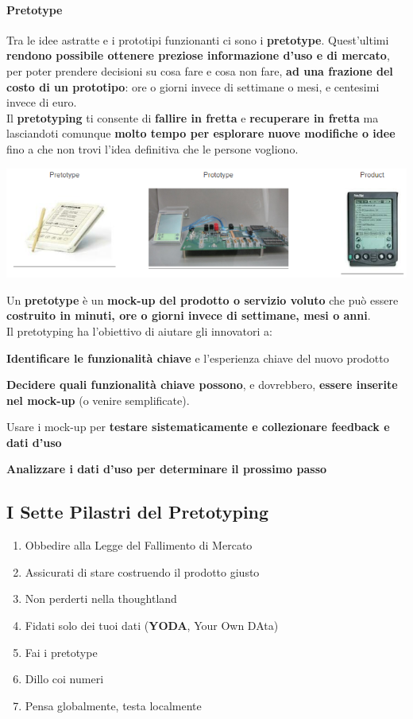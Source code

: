 \documentclass[10pt]{article}
\begin{document}
\paragraph{Pretotype} Tra le idee astratte e i prototipi funzionanti ci sono i \textbf{pretotype}. Quest'ultimi \textbf{rendono possibile ottenere preziose informazione d'uso e di mercato}, per poter prendere decisioni su cosa fare e cosa non fare, \textbf{ad una frazione del costo di un prototipo}: ore o giorni invece di settimane o mesi, e centesimi invece di euro.\\
Il \textbf{pretotyping} ti consente di \textbf{fallire in fretta} e \textbf{recuperare in fretta} ma lasciandoti comunque \textbf{molto tempo per esplorare nuove modifiche o idee} fino a che non trovi l'idea definitiva che le persone vogliono.
\begin{center}
\includegraphics[scale=1]{pretotype.png}
\end{center}
Un \textbf{pretotype} è un \textbf{mock-up del prodotto o servizio voluto} che può essere \textbf{costruito in minuti, ore o giorni invece di settimane, mesi o anni}.\\
Il pretotyping ha l'obiettivo di aiutare gli innovatori a:
\begin{list}{}{}
\item \textbf{Identificare le funzionalità chiave} e l'esperienza chiave del nuovo prodotto
\item \textbf{Decidere quali funzionalità chiave possono}, e dovrebbero, \textbf{essere inserite nel mock-up} (o venire semplificate).
\item Usare i mock-up per \textbf{testare sistematicamente e collezionare feedback e dati d'uso}
\item \textbf{Analizzare i dati d'uso per determinare il prossimo passo}
\end{list}
\subsection{I Sette Pilastri del Pretotyping}
\begin{enumerate}
\item Obbedire alla Legge del Fallimento di Mercato
\item Assicurati di stare costruendo il prodotto giusto
\item Non perderti nella thoughtland
\item Fidati solo dei tuoi dati (\textbf{YODA}, Your Own DAta)
\item Fai i pretotype
\item Dillo coi numeri
\item Pensa globalmente, testa localmente
\end{enumerate}
\pagebreak
\end{document}
